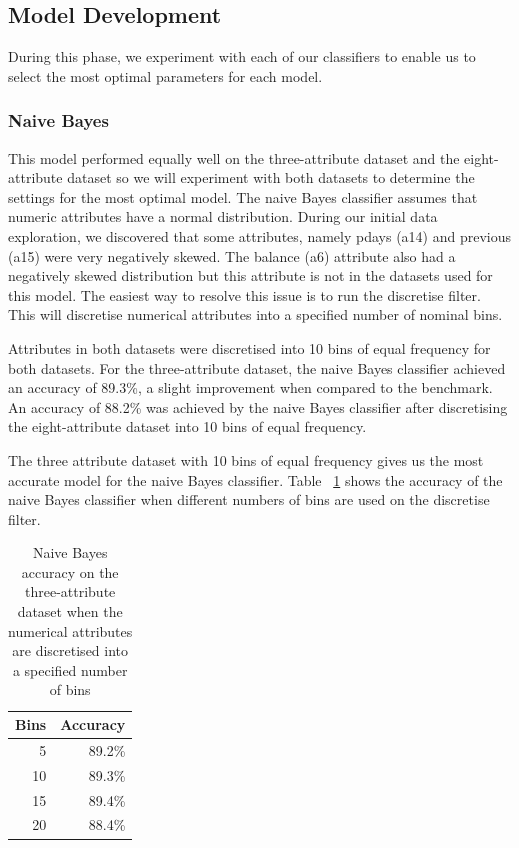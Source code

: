 \documentclass[a4paper,11pt]{article}
\begin{document}
\subsection{Model Development}

During this phase, we experiment with each of our classifiers to enable us to select the most optimal parameters
for each model.

\subsubsection{Naive Bayes}

This model performed equally well on the three-attribute dataset and the eight-attribute dataset so we will
experiment with both datasets to determine the settings for the most optimal model. The naive Bayes classifier
assumes that numeric attributes have a normal distribution. During our initial data exploration, we discovered
that some attributes, namely pdays (a14) and previous (a15) were very negatively skewed. The balance (a6) attribute
also had a negatively skewed distribution but this attribute is not in the datasets used for this model. The
easiest way to resolve this issue is to run the discretise filter. This will discretise numerical attributes into
a specified number of nominal bins.

Attributes in both datasets were discretised into 10 bins of equal frequency for both datasets. For the three-attribute
dataset, the naive Bayes classifier achieved an accuracy of 89.3\%, a slight improvement when compared to the benchmark.
An accuracy of 88.2\% was achieved by the naive Bayes classifier after discretising the eight-attribute dataset into
10 bins of equal frequency.

The three attribute dataset with 10 bins of equal frequency gives us the most accurate model for the naive Bayes
classifier. Table ~\ref{tab:naiveBayesBins} shows the accuracy of the naive Bayes classifier when different numbers of
bins are used on the discretise filter. 

\begin{table}[H]
  \begin{center}
    \begin{tabular}{r | r}
      Bins & Accuracy  \\ \hline
      5 & 89.2\% \\
      10 & 89.3\% \\
      15 & 89.4\% \\
      20 & 88.4\% \\
    \end{tabular}
  \end{center}
  \caption{Naive Bayes accuracy on the three-attribute dataset when the numerical attributes are discretised
  into a specified number of bins}
  \label{tab:naiveBayesBins}
\end{table}
\end{document}
